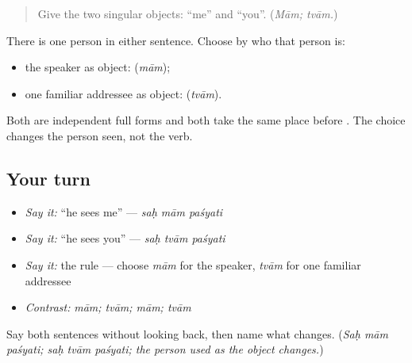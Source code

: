 \label{lesson:SA-C260-singular-object-practice}



\begin{quote}
Give the two singular objects: “me” and “you”. (\emph{Mām; tvām.})
\end{quote}

\begin{grammarlens}[title={Grammar Lens: choose by person}]
There is one person in either sentence. Choose by who that person is:

\begin{itemize}
\raggedright
  \item the speaker as object: \textbf{} (\emph{mām});
  \item one familiar addressee as object: \textbf{} (\emph{tvām}).
\end{itemize}

Both are independent full forms and both take the same place before \textbf{}. The choice changes the person seen, not the verb.
\end{grammarlens}

\subsection*{Your turn}
\begin{itemize}
\raggedright
  \item \emph{Say it:} “he sees me” — \emph{saḥ mām paśyati}
  \item \emph{Say it:} “he sees you” — \emph{saḥ tvām paśyati}
  \item \emph{Say it:} the rule — choose \emph{mām} for the speaker, \emph{tvām} for one familiar addressee
  \item \emph{Contrast:} \emph{mām; tvām; mām; tvām}
\end{itemize}

\begin{tcolorbox}[breakable,colback=teal!4,colframe=teal!35!black,title={Before you move on}]
Say both sentences without looking back, then name what changes. (\emph{Saḥ mām paśyati; saḥ tvām paśyati; the person used as the object changes.})
\end{tcolorbox}
